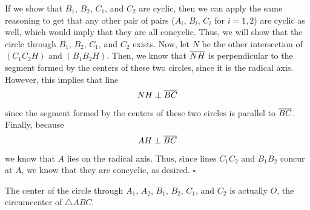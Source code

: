 \documentclass{article}
\begin{document}
If we show that $B_1$, $B_2$, $C_1$, and $C_2$ are cyclic, then we can apply the same reasoning to get that any other pair of pairs ($A_i$, $B_i$, $C_i$ for $i = 1,2$) are cyclic as well, which would imply that they are all concyclic. Thus, we will show that the circle through $B_1$, $B_2$, $C_1$, and $C_2$ exists. Now, let $N$ be the other intersection of $(C_1C_2H)$ and $(B_1B_2H)$. Then, we know that $\overline{NH}$ is perpendicular to the segment formed by the centers of these two circles, since it is the radical axis. However, this implies that line \[NH \perp \overline{BC}\] since the segment formed by the centers of these two circles is parallel to $\overline{BC}$. Finally, because \[AH \perp \overline{BC}\] we know that $A$ lies on the radical axis. Thus, since lines $C_1C_2$ and $B_1B_2$ concur at $A$, we know that they are concyclic, as desired. $\square$

\begin{remark*}
The center of the circle through $A_1$, $A_2$, $B_1$, $B_2$, $C_1$, and $C_2$ is actually $O$, the circumcenter of $\triangle ABC$.
\end{remark*}

\newpage
\end{document}
